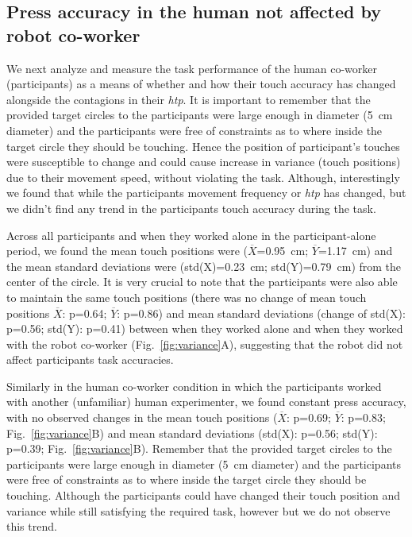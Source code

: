\subsection{Press accuracy in the human not affected by robot co-worker}
 
We next analyze and measure the task performance of the human co-worker (participants) as a means of whether and how their touch accuracy has changed alongside the contagions in their \textit{htp}. It is important to remember that the provided target circles to the participants were large enough in diameter (5~cm diameter) and the participants were free of constraints as to where inside the target circle they should be touching. Hence the position of participant's touches were susceptible to change and could cause increase in variance (touch positions) due to their movement speed, without violating the task. Although, interestingly we found that while the participants movement frequency or {\it htp} has changed, but we didn't find any trend in the participants touch accuracy during the task. 

Across all participants and when they worked alone in the participant-alone period, we found the mean touch positions were ($\overline{X}$=0.95~cm; $\overline{Y}$=1.17~cm) and the mean standard deviations were (std(X)=0.23~cm; std(Y)=0.79~cm) from the center of the circle. It is very crucial to note that the participants were also able to maintain the same touch positions (there was no change of mean touch positions $\overline{X}$: p=0.64; $\overline{Y}$: p=0.86) and mean standard deviations (change of std(X): p=0.56; std(Y): p=0.41) between when they worked alone and when they worked with the robot co-worker (Fig.~\ref{fig:variance}A), suggesting that the robot did not affect participants task accuracies.

Similarly in the human co-worker condition in which the participants worked with another (unfamiliar) human experimenter, we found constant press accuracy, with no observed changes in the mean touch positions ($\overline{X}$: p=0.69; $\overline{Y}$: p=0.83; Fig.~\ref{fig:variance}B) and mean standard deviations (std(X): p=0.56; std(Y): p=0.39; Fig.~\ref{fig:variance}B). Remember that the provided target circles to the participants were large enough in diameter (5~cm diameter) and the participants were free of constraints as to where inside the target circle they should be touching. Although the participants could have changed their touch position and variance while still satisfying the required task, however but we do not observe this trend. 

